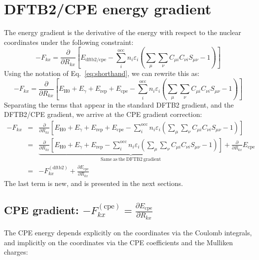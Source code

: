 \documentclass{article}
\numberwithin{equation}{section}
\begin{document}
\section{DFTB2/CPE energy gradient}
The energy gradient is the derivative of the energy with respect to the nuclear coordinates under the following constraint:\cite{dftb3}
\begin{equation}
    - F_{kx} = \frac{\partial}{\partial R_{kx}} \left[ E_\mathrm{{dftb2/cpe}} - \sum_i^\mathrm{occ} n_i \varepsilon_i \left(\sum_{\mu} \sum_{\nu} C_{\mu i} C_{\nu i} S_{\mu\nu} - 1  \right) \right]
\end{equation}
Using the notation of Eq.~\ref{eq:shorthand}, we can rewrite this as:
\begin{equation}
    - F_{kx} = \frac{\partial}{\partial R_{kx}} \left[  E_\mathrm{H0} + E_\gamma + E_\mathrm{rep} + E_\mathrm{cpe} - \sum_i^\mathrm{occ} n_i \varepsilon_i \left(\sum_{\mu} \sum_{\nu} C_{\mu i} C_{\nu i} S_{\mu\nu} - 1 \right) \right]
\end{equation}
Separating the terms that appear in the standard DFTB2 gradient, and the DFTB2/CPE gradient, we arrive at the CPE gradient correction:
\begin{eqnarray}
    - F_{kx} &=& \frac{\partial}{\partial R_{kx}} \left[  E_\mathrm{H0} + E_\gamma + E_\mathrm{rep}  + E_\mathrm{cpe} - \sum_i^\mathrm{occ} n_i \varepsilon_i \left(\sum_{\mu} \sum_{\nu} C_{\mu i} C_{\nu i} S_{\mu\nu} - 1 \right) \right]\nonumber\\
             &=& \underbrace{\frac{\partial}{\partial R_{kx}} \left[  E_\mathrm{H0} + E_\gamma  + E_\mathrm{rep}- \sum_i^\mathrm{occ} n_i \varepsilon_i \left(\sum_{\mu} \sum_{\nu} C_{\mu i} C_{\nu i} S_{\mu\nu} - 1 \right) \right]}_{\mathrm{Same~as~the~DFTB2~gradient}}
    +\frac{\partial}{\partial R_{kx}} E_\mathrm{cpe} \nonumber\\
    &=& -F_{kx}^\mathrm{(dftb2)} + \frac{\partial E_\mathrm{cpe}}{\partial R_{kx}}
\end{eqnarray}
The last term is new, and is presented in the next sections.

\subsection{CPE gradient: $-F_{kx}^\mathrm{(cpe)} = \frac{\partial E_\mathrm{cpe}}{\partial R_{kx}}$}
The CPE energy depends explicitly on the coordinates via the Coulomb integrals, and implicitly on the coordinates via the CPE coefficients and the Mulliken charges:
\end{document}
